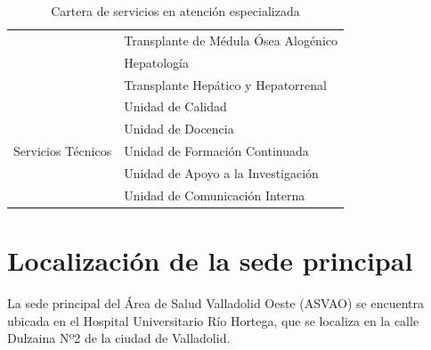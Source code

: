 \begin{table}[H]
\begin{tabular}{cl}
                                                            & Transplante de Médula Ósea Alogénico \\
                                                            & Hepatología                          \\
                                                            & Transplante Hepático y Hepatorrenal  \\
        \midrule
        \multirow{5}{*}{Servicios Técnicos}                 & Unidad de Calidad                    \\
                                                            & Unidad de Docencia                   \\
                                                            & Unidad de Formación Continuada       \\
                                                            & Unidad de Apoyo a la Investigación   \\
                                                            & Unidad de Comunicación Interna       \\
        \bottomrule
    \end{tabular}
    \caption{Cartera de servicios en atención especializada}
\end{table}

\section{Localización de la sede principal}

La sede principal del Área de Salud Valladolid Oeste (ASVAO) se encuentra ubicada en el Hospital Universitario Río Hortega, que se localiza en la calle Dulzaina Nº2 de la ciudad de Valladolid.

